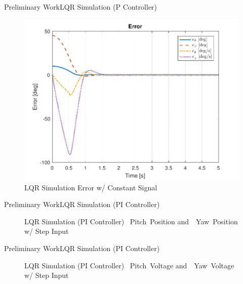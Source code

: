 \documentclass{beamer}
\begin{document}
\begin{frame}{Preliminary Work}{LQR Simulation (P Controller)}
    \begin{figure}
      \centering 
      \includegraphics[scale=0.5]{figs/MATLAB/LQR/P_Simulation/LQR_Error_Con}
      \caption{LQR Simulation Error w/ Constant Signal}
      \label{fig:LQR_Error_Con}
    \end{figure}
\end{frame}

\begin{frame}{Preliminary Work}{LQR Simulation (PI Controller)}
    \begin{figure}
      \centering
      \caption{LQR Simulation (PI Controller) ~Pitch~Position and~~Yaw~Position w/ Step Input}
      \label{fig:LQR_PI_Sim_pos}
    \end{figure}
\end{frame}

\begin{frame}{Preliminary Work}{LQR Simulation (PI Controller)}
    \begin{figure}
      \centering
      \caption{LQR Simulation (PI Controller) ~Pitch~Voltage and~~Yaw~Voltage w/ Step Input}
      \label{fig:LQR_PI_Sim_volt}
    \end{figure}
\end{frame}
\end{document}
